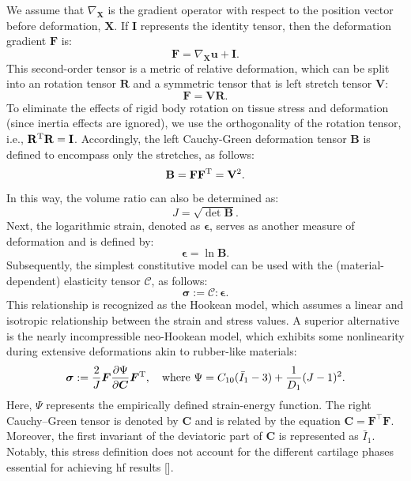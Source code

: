 \documentclass[12pt,a4paper]{report}
\begin{document}
We assume that $\nabla_\mathbf{X}$ is the gradient operator with respect to the position vector before deformation, $\mathbf{X}$. If $\mathbf{I}$ represents the identity tensor, then the deformation gradient $\mathbf{F}$ is:
%
\begin{equation}
    \mathbf{F} = \nabla_\mathbf{X} \mathbf{u} + \mathbf{I}.
\end{equation}
%
This second-order tensor is a metric of relative deformation, which can be split into an rotation tensor $\mathbf{R}$ and a symmetric tensor that is left stretch tensor $\mathbf{V}$:
%
\begin{equation}
    \mathbf{F} = \mathbf{V} \mathbf{R}. \label{eq1-1}
\end{equation}
%
To eliminate the effects of rigid body rotation on tissue stress and deformation (since inertia effects are ignored), we use the orthogonality of the rotation tensor, i.e., $\mathbf{R}^{\rm T}\mathbf{R} = \mathbf{I}$. Accordingly, the left Cauchy-Green deformation tensor $\mathbf{B}$ is defined to encompass only the stretches, as follows:
%
\begin{equation}
\mathbf{B} = \mathbf{F} \mathbf{F}^{\rm T} = \mathbf{V}^2.
\end{equation}
%
In this way, the volume ratio can also be determined as:
%
\begin{equation}
J = \sqrt{\det \mathbf{B}}.
\end{equation}
%
Next, the logarithmic strain, denoted as $\bm{\epsilon}$, serves as another measure of deformation and is defined by:
%
\begin{equation}
\bm{\epsilon} = \ln \mathbf{B}.
\end{equation}
%
Subsequently, the simplest constitutive model can be used with the (material-dependent) elasticity tensor $\mathcal{C}$, as follows:
%
\begin{equation}
\bm{\sigma} := \mathcal{C} : \bm{\epsilon}.
\end{equation}
%
This relationship is recognized as the Hookean model, which assumes a linear and isotropic relationship between the strain and stress values. A superior alternative is the nearly incompressible neo-Hookean model, which exhibits some nonlinearity during extensive deformations akin to rubber-like materials:
%
\begin{equation}\label{eq-hyperelastic}
\bm{\sigma} :=\frac{2}{J}
\bm{F}\frac{\partial\Psi}{\partial\bm{C}}\bm{F}^{\rm T},
\quad \text{where }
\Psi = C_{10}(\bar{I}_1 - 3) + \frac{1}{D_1}(J - 1)^2.
\end{equation}
%
Here, $\Psi$ represents the empirically defined strain-energy function. The right Cauchy–Green tensor is denoted by \( \mathbf{C} \) and is related by the equation \( \mathbf{C} = \mathbf{F}^{\top} \mathbf{F} \). Moreover, the first invariant of the deviatoric part of \( \mathbf{C} \) is represented as \( \bar{I}_1 \). Notably, this stress definition does not account for the different cartilage phases essential for achieving \ac{hf} results [\cite{gerhard-book}].
\end{document}
